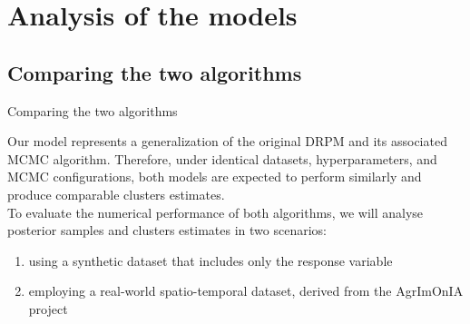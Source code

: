 \documentclass[
	11pt, %
 xcolor={dvipsnames,svgnames}
]{beamer}
\let\cite\citep
\newcommand{\balert}[1]{\textbf{\alert{#1}}}
\begin{document}
\section{Analysis of the models}



\subsection{Comparing the two algorithms}

\begin{frame}{Comparing the two algorithms}

Our model represents a generalization of the original DRPM and its associated MCMC algorithm. 
Therefore, under identical datasets, hyperparameters, and MCMC configurations, both models are expected to perform similarly and produce comparable clusters estimates.\\[6pt]
To evaluate the numerical performance of both algorithms, we will analyse posterior samples and clusters estimates in two scenarios: 
\begin{enumerate}
    \item using a synthetic dataset that includes only the response variable
    \item employing a real-world spatio-temporal dataset, derived from the AgrImOnIA project \cite{agrimonia}
\end{enumerate}

\end{frame}
\end{document}
